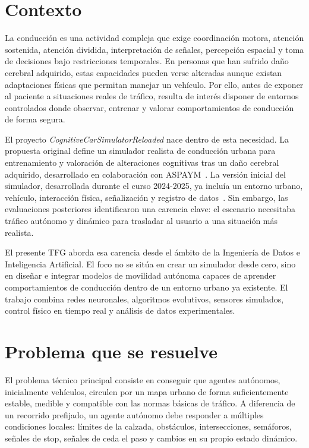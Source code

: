 \section{Contexto}

La conducción es una actividad compleja que exige coordinación motora, atención sostenida, atención dividida, interpretación de señales, percepción espacial y toma de decisiones bajo restricciones temporales. En personas que han sufrido daño cerebral adquirido, estas capacidades pueden verse alteradas aunque existan adaptaciones físicas que permitan manejar un vehículo. Por ello, antes de exponer al paciente a situaciones reales de tráfico, resulta de interés disponer de entornos controlados donde observar, entrenar y valorar comportamientos de conducción de forma segura.

El proyecto \textit{CognitiveCarSimulatorReloaded} nace dentro de esta necesidad. La propuesta original define un simulador realista de conducción urbana para entrenamiento y valoración de alteraciones cognitivas tras un daño cerebral adquirido, desarrollado en colaboración con ASPAYM~\cite{propuesta}. La versión inicial del simulador, desarrollada durante el curso 2024-2025, ya incluía un entorno urbano, vehículo, interacción física, señalización y registro de datos~\cite{cognitivecar2025}. Sin embargo, las evaluaciones posteriores identificaron una carencia clave: el escenario necesitaba tráfico autónomo y dinámico para trasladar al usuario a una situación más realista.

El presente TFG aborda esa carencia desde el ámbito de la Ingeniería de Datos e Inteligencia Artificial. El foco no se sitúa en crear un simulador desde cero, sino en diseñar e integrar modelos de movilidad autónoma capaces de aprender comportamientos de conducción dentro de un entorno urbano ya existente. El trabajo combina redes neuronales, algoritmos evolutivos, sensores simulados, control físico en tiempo real y análisis de datos experimentales.

\section{Problema que se resuelve}

El problema técnico principal consiste en conseguir que agentes autónomos, inicialmente vehículos, circulen por un mapa urbano de forma suficientemente estable, medible y compatible con las normas básicas de tráfico. A diferencia de un recorrido prefijado, un agente autónomo debe responder a múltiples condiciones locales: límites de la calzada, obstáculos, intersecciones, semáforos, señales de stop, señales de ceda el paso y cambios en su propio estado dinámico.

